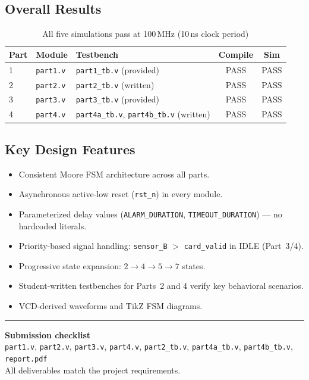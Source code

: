 \documentclass[12pt,a4paper]{ctexart}
\begin{document}
\subsection*{Overall Results}
\begin{table}[H]
\centering
\begin{tabular}{lllcc}
\toprule
\textbf{Part} & \textbf{Module} & \textbf{Testbench} & \textbf{Compile} & \textbf{Sim} \\
\midrule
1 & \texttt{part1.v} & \texttt{part1\_tb.v} (provided) & PASS & PASS \\
2 & \texttt{part2.v} & \texttt{part2\_tb.v} (written)  & PASS & PASS \\
3 & \texttt{part3.v} & \texttt{part3\_tb.v} (provided) & PASS & PASS \\
4 & \texttt{part4.v} & \texttt{part4a\_tb.v}, \texttt{part4b\_tb.v} (written) & PASS & PASS \\
\bottomrule
\end{tabular}
\caption{All five simulations pass at 100\,MHz (10\,ns clock period)}
\end{table}

\subsection*{Key Design Features}
\begin{itemize}
  \item Consistent Moore FSM architecture across all parts.
  \item Asynchronous active-low reset (\texttt{rst\_n}) in every
        module.
  \item Parameterized delay values (\texttt{ALARM\_DURATION},
        \texttt{TIMEOUT\_DURATION}) — no hardcoded literals.
  \item Priority-based signal handling: \texttt{sensor\_B} $>$
        \texttt{card\_valid} in IDLE (Part~3/4).
  \item Progressive state expansion: $2 \to 4 \to 5 \to 7$ states.
  \item Student-written testbenches for Parts~2 and 4 verify key
        behavioral scenarios.
  \item VCD-derived waveforms and TikZ FSM diagrams.
\end{itemize}

\vspace{1em}
\noindent\rule{\textwidth}{0.5pt}
\begin{center}
\textbf{Submission checklist}\\[0.3em]
\texttt{part1.v}, \texttt{part2.v}, \texttt{part3.v}, \texttt{part4.v},
\texttt{part2\_tb.v}, \texttt{part4a\_tb.v}, \texttt{part4b\_tb.v},
\texttt{report.pdf}\\[0.3em]
All deliverables match the project requirements.
\end{center}
\end{document}
